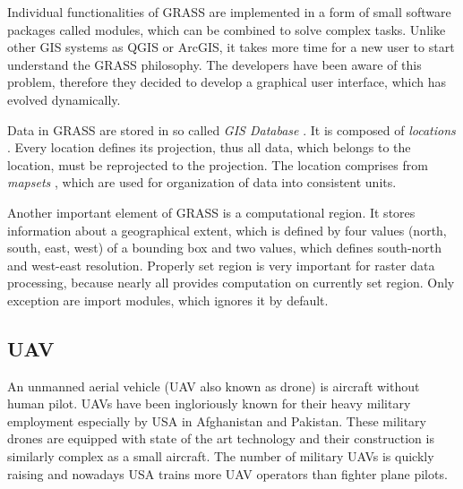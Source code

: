 \documentclass[a4paper,12pt]{article}
\newcommand{\term}[1]{
{\it #1}
}
\begin{document}

Individual functionalities of GRASS are implemented in a form of small software packages called modules, which 
can be combined to solve complex tasks.
Unlike other GIS systems as QGIS or ArcGIS, it takes 
more time for a new user to start understand the GRASS philosophy. The developers 
have been aware of this problem, therefore they decided to develop a graphical user interface, which 
has evolved dynamically.


Data in GRASS are stored in so called  \term{GIS Database}. It is composed of \term{locations}. Every location 
defines its projection, thus all data, which belongs to the location, must be reprojected to the 
projection. The location comprises from \term{mapsets}, which are used for organization 
of data into consistent units. 




Another important element of GRASS is a computational region. It stores information about a geographical
extent, which is defined by four values (north, south, east, west) of a bounding box and 
two values, which defines south-north and west-east resolution. Properly set region is 
very important for raster data processing, because nearly all provides computation 
on currently set region. Only exception are import modules, which ignores it by default.


\subsection{UAV}


An unmanned aerial vehicle (UAV also known as drone) is aircraft without human pilot.  UAVs have been ingloriously known for
their heavy military employment especially by USA in Afghanistan and Pakistan. These military drones are equipped with state of the art 
technology and their construction is similarly complex as a small aircraft.  
The number of military UAVs is quickly raising and nowadays USA trains more UAV operators than fighter plane pilots.
\end{document}
